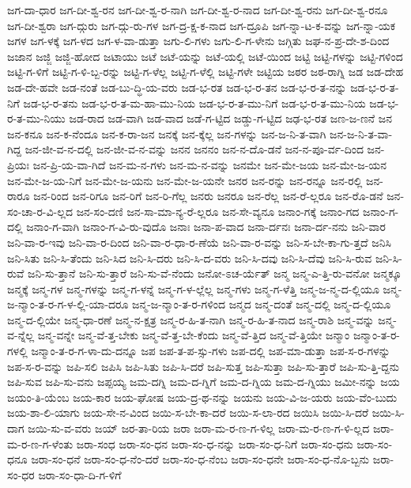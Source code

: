 {ಜಗ-ದಾ-ಧಾರ
ಜಗ-ದೀ-ಶ್ವ-ರನ
ಜಗ-ದೀ-ಶ್ವ-ರ-ನಾಗಿ
ಜಗ-ದೀ-ಶ್ವ-ರ-ನಾದ
ಜಗ-ದೀ-ಶ್ವ-ರನು
ಜಗ-ದೀ-ಶ್ವ-ರನೂ
ಜಗ-ದೀ-ಶ್ವರಾ
ಜಗ-ದ್ಗುರು
ಜಗ-ದ್ಗು-ರು-ಗಳ
ಜಗ-ದ್ರ-ಕ್ಷ-ಕ-ನಾದ
ಜಗ-ದ್ರೂಪಿ
ಜಗ-ನ್ನಾ-ಟ-ಕ-ವನ್ನು
ಜಗ-ನ್ನಾ-ಯಕ
ಜಗಳ
ಜಗ-ಳಕ್ಕೆ
ಜಗ-ಳದ
ಜಗ-ಳ-ವಾ-ಡುತ್ತಾ
ಜಗು-ಲಿ-ಗಳು
ಜಗು-ಲಿ-ಗ-ಳೇನು
ಜಗ್ಗಿತು
ಜಘ-ನ-ಪ್ರ-ದೇ-ಶ-ದಿಂದ
ಜಜಾನ
ಜಜ್ಜಿ
ಜಜ್ಜಿ-ಹೋದ
ಜಟಾಯು
ಜಟೆ
ಜಟೆ-ಯನ್ನು
ಜಟೆ-ಯಲ್ಲಿ
ಜಟೆ-ಯಿಂದ
ಜಟ್ಟಿ
ಜಟ್ಟಿ-ಗಳನ್ನು
ಜಟ್ಟಿ-ಗಳಿಂದ
ಜಟ್ಟಿ-ಗ-ಳಿಗೆ
ಜಟ್ಟಿ-ಗ-ಳಿ-ಬ್ಬ-ರನ್ನು
ಜಟ್ಟಿ-ಗ-ಳೆಲ್ಲ
ಜಟ್ಟಿ-ಗ-ಳೆಲ್ಲಿ
ಜಟ್ಟಿ-ಗಳೇ
ಜಟ್ಟಿಯ
ಜಠರ
ಜಠ-ರಾಗ್ನಿ
ಜಡ
ಜಡ-ದೇಹ
ಜಡ-ದೇ-ಹವೇ
ಜಡ-ನಂತೆ
ಜಡ-ಬು-ದ್ಧಿ-ಯ-ವರು
ಜಡ-ಭ-ರತ
ಜಡ-ಭ-ರ-ತನ
ಜಡ-ಭ-ರ-ತ-ನನ್ನು
ಜಡ-ಭ-ರ-ತ-ನಿಗೆ
ಜಡ-ಭ-ರ-ತನು
ಜಡ-ಭ-ರ-ತ-ಮ-ಹಾ-ಮು-ನಿಯ
ಜಡ-ಭ-ರ-ತ-ಮು-ನಿಗೆ
ಜಡ-ಭ-ರ-ತ-ಮು-ನಿಯ
ಜಡ-ಭ-ರ-ತ-ಮು-ನಿಯು
ಜಡ-ರಾದ
ಜಡ-ವಾಗಿ
ಜಡ-ವಾದ
ಜಡೆ-ಗ-ಟ್ಟಿದ
ಜಡ್ಡು-ಗ-ಟ್ಟಿದ
ಜಢ-ಭ-ರತ
ಜಣ-ಜ-ಣನೆ
ಜನ
ಜನ-ಕನೂ
ಜನ-ಕ-ನೆಂದೂ
ಜನ-ಕ-ರಾ-ಜನ
ಜನಕ್ಕೆ
ಜನ-ಕ್ಕೆಲ್ಲ
ಜನ-ಗಳನ್ನು
ಜನ-ಜ-ನಿ-ತ-ವಾಗಿ
ಜನ-ಜ-ನಿ-ತ-ವಾ-ಗಿದ್ದ
ಜನ-ಜೀ-ವ-ನ-ದಲ್ಲಿ
ಜನ-ಜೀ-ವ-ನ-ವನ್ನು
ಜನನ
ಜನನಂ
ಜನ-ನ-ದೊ-ಡನೆ
ಜನ-ನ-ಪೂ-ರ್ವ-ದಿಂದ
ಜನ-ಪ್ರಿಯಃ
ಜನ-ಪ್ರಿ-ಯ-ವಾ-ಗಿದೆ
ಜನ-ಮ-ನ-ಗಳು
ಜನ-ಮ-ನ-ವನ್ನು
ಜನಮೇ
ಜನ-ಮೇ-ಜಯ
ಜನ-ಮೇ-ಜ-ಯನ
ಜನ-ಮೇ-ಜ-ಯ-ನಿಗೆ
ಜನ-ಮೇ-ಜ-ಯನು
ಜನ-ಮೇ-ಜ-ಯನೇ
ಜನರ
ಜನ-ರನ್ನು
ಜನ-ರನ್ನೂ
ಜನ-ರಲ್ಲಿ
ಜನ-ರಾರೂ
ಜನ-ರಿಂದ
ಜನ-ರಿಗೂ
ಜನ-ರಿಗೆ
ಜನ-ರಿ-ಗೆಲ್ಲ
ಜನರು
ಜನರೂ
ಜನ-ರೆಲ್ಲ
ಜನ-ರೆ-ಲ್ಲರೂ
ಜನ-ರೊ-ಡನೆ
ಜನ-ಸಂ-ಚಾ-ರ-ವಿ-ಲ್ಲದ
ಜನ-ಸಂ-ದಣಿ
ಜನ-ಸಾ-ಮಾ-ನ್ಯ-ರೆ-ಲ್ಲರೂ
ಜನ-ಸೇ-ವ್ಯನೂ
ಜನಾಂ-ಗಕ್ಕೆ
ಜನಾಂ-ಗದ
ಜನಾಂ-ಗ-ದಲ್ಲಿ
ಜನಾಂ-ಗ-ವಾಗಿ
ಜನಾಂ-ಗ-ವಿ-ರು-ವುದೊ
ಜನಾಃ
ಜನಾ-ಪ-ವಾದ
ಜನಾ-ರ್ದನಃ
ಜನಾ-ರ್ದ-ನನು
ಜನಿ-ವಾರ
ಜನಿ-ವಾ-ರ-ಇವು
ಜನಿ-ವಾ-ರ-ದಿಂದ
ಜನಿ-ವಾ-ರ-ಧಾ-ರ-ಣೆಯೆ
ಜನಿ-ವಾ-ರ-ವನ್ನು
ಜನಿ-ಸ-ಬೇ-ಕಾ-ಗು-ತ್ತದೆ
ಜನಿಸಿ
ಜನಿ-ಸಿತು
ಜನಿ-ಸಿ-ತೆಂದು
ಜನಿ-ಸಿದ
ಜನಿ-ಸಿ-ದರು
ಜನಿ-ಸಿ-ದ-ವರು
ಜನಿ-ಸಿ-ದವು
ಜನಿ-ಸಿ-ದೆವು
ಜನಿ-ಸಿ-ರುವ
ಜನಿ-ಸಿ-ರುವೆ
ಜನಿ-ಸು-ತ್ತಾನೆ
ಜನಿ-ಸು-ತ್ತಾರೆ
ಜನಿ-ಸು-ವೆ-ನೆಂದು
ಜನೋ-ಽಚ-ರ್ಯೆತ್
ಜನ್ಮ
ಜನ್ಮ-ಎ-ತ್ತಿ-ರು-ವನೋ
ಜನ್ಮಕ್ಕೂ
ಜನ್ಮಕ್ಕೆ
ಜನ್ಮ-ಗಳ
ಜನ್ಮ-ಗಳನ್ನು
ಜನ್ಮ-ಗ-ಳನ್ನೆ
ಜನ್ಮ-ಗ-ಳ-ಲ್ಲೆಲ್ಲ
ಜನ್ಮ-ಗಳು
ಜನ್ಮ-ಗ-ಳೆತ್ತಿ
ಜನ್ಮ-ಜ-ನ್ಮ-ದ-ಲ್ಲಿಯೂ
ಜನ್ಮ-ಜ-ನ್ಮಾಂ-ತ-ರ-ಗ-ಳ-ಲ್ಲಿ-ಯಾ-ದರೂ
ಜನ್ಮ-ಜ-ನ್ಮಾಂ-ತ-ರ-ಗಳಿಂದ
ಜನ್ಮದ
ಜನ್ಮ-ದಂತೆ
ಜನ್ಮ-ದಲ್ಲಿ
ಜನ್ಮ-ದ-ಲ್ಲಿಯೂ
ಜನ್ಮ-ದ-ಲ್ಲಿಯೇ
ಜನ್ಮ-ಧಾ-ರಣೆ
ಜನ್ಮ-ನ-ಕ್ಷತ್ರ
ಜನ್ಮ-ರ-ಹಿ-ತ-ನಾಗಿ
ಜನ್ಮ-ರ-ಹಿ-ತ-ನಾದ
ಜನ್ಮ-ರಾಶಿ
ಜನ್ಮ-ವನ್ನು
ಜನ್ಮ-ವ-ನ್ನೆಲ್ಲ
ಜನ್ಮ-ವನ್ನೇ
ಜನ್ಮ-ವೆ-ತ್ತ-ಬೇಕು
ಜನ್ಮ-ವೆ-ತ್ತ-ಬೇ-ಕೆಂದು
ಜನ್ಮ-ವೆ-ತ್ತಿದ
ಜನ್ಮ-ವೆ-ತ್ತಿಯೇ
ಜನ್ಮಾಂ
ಜನ್ಮಾಂ-ತ-ರ-ಗಳಲ್ಲಿ
ಜನ್ಮಾಂ-ತ-ರ-ಗ-ಳಾ-ದು-ದನ್ನೂ
ಜಪ
ಜಪ-ತ-ಪ-ಸ್ಸು-ಗಳು
ಜಪ-ದಲ್ಲಿ
ಜಪ-ಮಾ-ಡುತ್ತಾ
ಜಪ-ಸ-ರ-ಗಳನ್ನು
ಜಪ-ಸ-ರ-ವನ್ನು
ಜಪಿ-ಸಲಿ
ಜಪಿಸಿ
ಜಪಿ-ಸಿತು
ಜಪಿ-ಸಿ-ದರೆ
ಜಪಿ-ಸುತ್ತ
ಜಪಿ-ಸುತ್ತಾ
ಜಪಿ-ಸು-ತ್ತಾರೆ
ಜಪಿ-ಸು-ತ್ತಿ-ದ್ದನು
ಜಪಿ-ಸುವ
ಜಪಿ-ಸು-ವನು
ಜಪ್ಪಯ್ಯ
ಜಮ-ದಗ್ನಿ
ಜಮ-ದ-ಗ್ನಿಗೆ
ಜಮ-ದ-ಗ್ನಿಯ
ಜಮ-ದ-ಗ್ನಿಯು
ಜಮೀ-ನನ್ನು
ಜಯ
ಜಯಂ-ತಿ-ಯೆಂಬ
ಜಯ-ಕಾರ
ಜಯ-ಘೋಷ
ಜಯ-ದ್ರ-ಥ-ನನ್ನು
ಜಯನು
ಜಯ-ವಿ-ಜ-ಯರು
ಜಯ-ವೆಂ-ಬುದು
ಜಯ-ಶಾ-ಲಿ-ಯಾಗು
ಜಯ-ಸೇ-ನ-ವಿಂದ
ಜಯಿ-ಸ-ಬೇ-ಕಾ-ದರೆ
ಜಯಿ-ಸ-ಲಾ-ರದ
ಜಯಿಸಿ
ಜಯಿ-ಸಿ-ದರೆ
ಜಯಿ-ಸಿ-ದಾಗ
ಜಯಿ-ಸು-ವ-ವರು
ಜಯ್
ಜರ-ತಾ-ರಿಯ
ಜರಾ
ಜರಾ-ಮ-ರ-ಣ-ಗ-ಳಿಲ್ಲ
ಜರಾ-ಮ-ರ-ಣ-ಗ-ಳಿ-ಲ್ಲದ
ಜರಾ-ಮ-ರ-ಣ-ಗ-ಳೆಂತು
ಜರಾ-ಸಂಧ
ಜರಾ-ಸಂ-ಧನ
ಜರಾ-ಸಂ-ಧ-ನನ್ನು
ಜರಾ-ಸಂ-ಧ-ನಿಗೆ
ಜರಾ-ಸಂ-ಧನು
ಜರಾ-ಸಂ-ಧನೂ
ಜರಾ-ಸಂ-ಧನೆ
ಜರಾ-ಸಂ-ಧ-ನೆಂ-ದರೆ
ಜರಾ-ಸಂ-ಧ-ನೆಂಬ
ಜರಾ-ಸಂ-ಧನೇ
ಜರಾ-ಸಂ-ಧ-ನೊ-ಬ್ಬನು
ಜರಾ-ಸಂ-ಧರ
ಜರಾ-ಸಂ-ಧಾ-ದಿ-ಗ-ಳಿಗೆ
}
